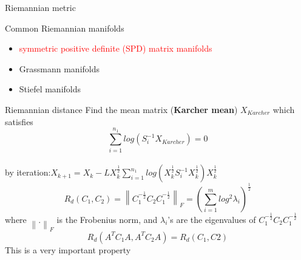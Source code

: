 \documentclass[10pt]{beamer}
\newcommand{\norm}[1]{\left\lVert#1\right\rVert}
\begin{document}
\begin{frame}{Riemannian metric}
    \begin{exampleblock}{Common Riemannian manifolds}
	\begin{itemize}
    \item \textcolor{red}{symmetric positive definite (SPD) matrix manifolds}
    \item Grassmann manifolds
    \item Stiefel manifolds
    \end{itemize}
    \end{exampleblock}
\end{frame}
\begin{frame}{Riemannian distance}
Find the mean matrix (\textbf{Karcher mean}) $X_{Karcher}$ which satisfies
    \begin{equation}\sum\limits^{n_1}_{i=1}log(S_i^{-1}X_{Karcher})=0\end{equation}\\
    by iteration:\href{https://www.sciencedirect.com/science/article/pii/S0024379511006616}{$
        X_{k+1}=X_k-L X_k^{\frac{1}{2}}\sum\limits^{n_1}_{i=1}log(X_k^{\frac{1}{2}}S_i^{-1}X_k^{\frac{1}{2}})X_k^{\frac{1}{2}}
        \label{eq:iteration2} $ } 
    \begin{equation}
R_d(C_1,C_2) = \norm{ C_1^{-\frac{1}{2}}C_2C_1^{-\frac{1}{2}}}_F = \left(  \sum_{i=1}^mlog^2\lambda_i  \right)^\frac{1}{2}
    \end{equation} 
    where $\norm{.}_F$ is the Frobenius norm, and $\lambda_i$'s are the eigenvalues  of $ C_1^{-\frac{1}{2}}C_2C_1^{-\frac{1}{2}}$
    \begin{equation}
        R_d(A^TC_1A,A^TC_2A)=R_d(C_1,C2)
    \end{equation}
    This is a very important property
\end{frame}
\end{document}

